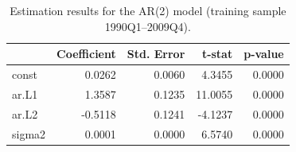 \begin{table}[H]
  \centering
  \caption{Estimation results for the AR(2) model (training sample 1990Q1--2009Q4).}
  \label{tab:estimates}
  \begin{tabular}{lrrrr}
  \toprule
   & Coefficient & Std. Error & t-stat & p-value \\
  \midrule
  const & 0.0262 & 0.0060 & 4.3455 & 0.0000 \\
  ar.L1 & 1.3587 & 0.1235 & 11.0055 & 0.0000 \\
  ar.L2 & -0.5118 & 0.1241 & -4.1237 & 0.0000 \\
  sigma2 & 0.0001 & 0.0000 & 6.5740 & 0.0000 \\
  \bottomrule
  \end{tabular}
\end{table}
